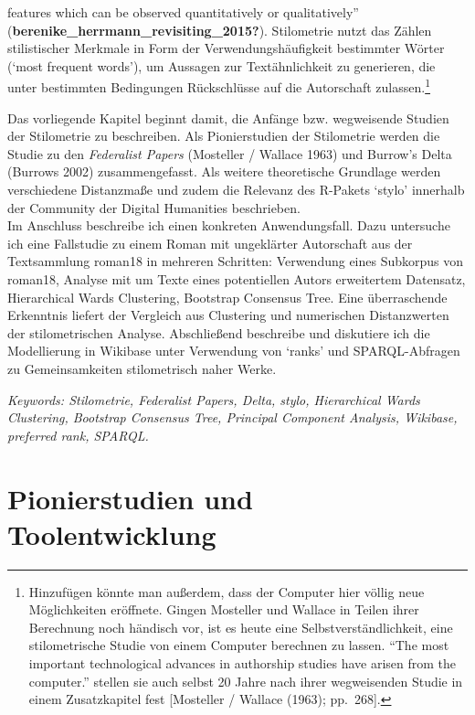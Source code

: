 \documentclass[
  12pt,
  letterpaper,
  DIV=11,
  numbers=noendperiod]{scrreprt}
\begin{document}
features which can be observed quantitatively or qualitatively''
(\textbf{berenike\_herrmann\_revisiting\_2015?}). Stilometrie nutzt das
Zählen stilistischer Merkmale in Form der Verwendungshäufigkeit
bestimmter Wörter (`most frequent words'), um Aussagen zur
Textähnlichkeit zu generieren, die unter bestimmten Bedingungen
Rückschlüsse auf die Autorschaft zulassen.\footnote{Hinzufügen könnte
  man außerdem, dass der Computer hier völlig neue Möglichkeiten
  eröffnete. Gingen Mosteller und Wallace in Teilen ihrer Berechnung
  noch händisch vor, ist es heute eine Selbstverständlichkeit, eine
  stilometrische Studie von einem Computer berechnen zu lassen. ``The
  most important technological advances in authorship studies have
  arisen from the computer.'' stellen sie auch selbst 20 Jahre nach
  ihrer wegweisenden Studie in einem Zusatzkapitel fest {[}Mosteller /
  Wallace (1963); pp.~268{]}.}

Das vorliegende Kapitel beginnt damit, die Anfänge bzw. wegweisende
Studien der Stilometrie zu beschreiben. Als Pionierstudien der
Stilometrie werden die Studie zu den \emph{Federalist Papers} (Mosteller
/ Wallace 1963) und Burrow's Delta (Burrows 2002) zusammengefasst. Als
weitere theoretische Grundlage werden verschiedene Distanzmaße und zudem
die Relevanz des R-Pakets `stylo' innerhalb der Community der Digital
Humanities beschrieben.\\
Im Anschluss beschreibe ich einen konkreten Anwendungsfall. Dazu
untersuche ich eine Fallstudie zu einem Roman mit ungeklärter
Autorschaft aus der Textsammlung roman18 in mehreren Schritten:
Verwendung eines Subkorpus von roman18, Analyse mit um Texte eines
potentiellen Autors erweitertem Datensatz, Hierarchical Wards
Clustering, Bootstrap Consensus Tree. Eine überraschende Erkenntnis
liefert der Vergleich aus Clustering und numerischen Distanzwerten der
stilometrischen Analyse. Abschließend beschreibe und diskutiere ich die
Modellierung in Wikibase unter Verwendung von `ranks' und
SPARQL-Abfragen zu Gemeinsamkeiten stilometrisch naher Werke.

\emph{Keywords: Stilometrie, Federalist Papers, Delta, stylo,
Hierarchical Wards Clustering, Bootstrap Consensus Tree, Principal
Component Analysis, Wikibase, preferred rank, SPARQL.}

\section{Pionierstudien und
Toolentwicklung}\label{pionierstudien-und-toolentwicklung}
\end{document}
